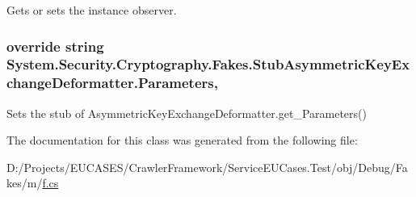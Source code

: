 Gets or sets the instance observer.

\hypertarget{class_system_1_1_security_1_1_cryptography_1_1_fakes_1_1_stub_asymmetric_key_exchange_deformatter_a91739c10b113fc583c84ba1855d26671}{
\subsubsection[{Parameters}]{\setlength{\rightskip}{0pt plus 5cm}override string System.\-Security.\-Cryptography.\-Fakes.\-Stub\-Asymmetric\-Key\-Exchange\-Deformatter.\-Parameters\hspace{0.3cm}{\ttfamily [get]}, {\ttfamily [set]}}}\label{class_system_1_1_security_1_1_cryptography_1_1_fakes_1_1_stub_asymmetric_key_exchange_deformatter_a91739c10b113fc583c84ba1855d26671}


Sets the stub of Asymmetric\-Key\-Exchange\-Deformatter.\-get\-\_\-\-Parameters()



The documentation for this class was generated from the following file\-:\begin{DoxyCompactItemize}
\item 
D\-:/\-Projects/\-E\-U\-C\-A\-S\-E\-S/\-Crawler\-Framework/\-Service\-E\-U\-Cases.\-Test/obj/\-Debug/\-Fakes/m/\hyperlink{m_2f_8cs}{f.\-cs}\end{DoxyCompactItemize}
